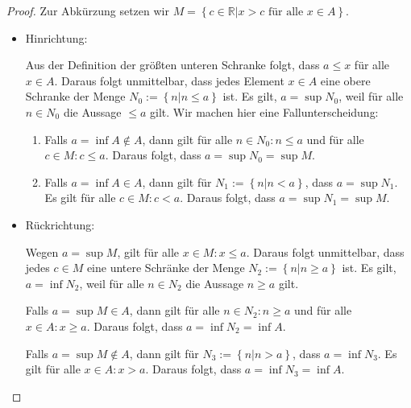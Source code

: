 \documentclass[12pt]{extarticle}
\begin{document}
  \begin{proof}

    Zur Abkürzung setzen wir $M = \left\{ c \in \mathbb{R} | x > c
       \text{ für alle } x \in A \right\}$.

      \begin{itemize}
      \item Hinrichtung:

        Aus der Definition der größten unteren Schranke folgt, dass
        \(a \leq x\) für alle \(x \in A\).  Daraus folgt unmittelbar, dass
        jedes Element \(x \in A\) eine obere Schranke der Menge
        \(N_0 := \left\{ n | n \leq a \right\}\) ist.  Es gilt, $a = \sup
        N_0$, weil für alle \(n \in N_0\) die Aussage \( \leq a\) gilt.
        Wir machen hier eine Fallunterscheidung:
         \begin{enumerate}
             \item Falls \(a = \inf A \notin A\), dann gilt für alle
             \(n \in N_0: n \leq a\) und für alle \(c \in M: c \leq a\).
             Daraus folgt, dass \(a = \sup N_0 = \sup M\).
             \item Falls \(a = \inf A \in A\), dann gilt für
             \(N_1 := \left\{ n | n < a \right\}\), dass \(a = \sup N_1\).  Es
             gilt für alle \(c \in M: c < a\).  Daraus folgt, dass
             \(a = \sup N_1 = \sup M\).
         \end{enumerate}

      \item Rückrichtung:

        Wegen \(a = \sup M\), gilt für alle \(x \in M: x \leq a\).  Daraus
        folgt unmittelbar, dass jedes \(c \in M\) eine untere Schränke
        der Menge \(N_2 := \left\{ n | n \geq a \right\}\) ist.  Es
        gilt, \(a = \inf N_2\), weil für alle \(n \in N_2\) die Aussage $n
        \geq a$ gilt.

        Falls \(a = \sup M \in A\), dann gilt für alle
        \(n \in N_2: n \geq a\) und für alle \(x \in A: x \geq a\).
        Daraus folgt, dass \(a = \inf N_2 = \inf A\).

        Falls \(a = \sup M \notin A \), dann gilt für
        \(N_3 := \left\{ n | n > a \right\}\), dass \(a = \inf N_3\). Es
        gilt für alle \(x \in A: x > a\).  Daraus folgt, dass
        \(a = \inf N_3 = \inf A\).
      \end{itemize}

    \end{proof}
\end{document}

